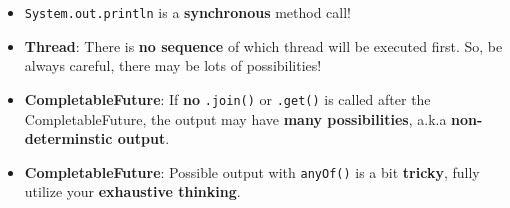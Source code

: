 \documentclass[10pt, landscape]{article}
\begin{document}
\begin{multicols}{4}
\begin{enumerate}
    \begin{itemize}
        \item \texttt{System.out.println} is a \textbf{synchronous} method call!
        \item \textbf{Thread}: There is \textbf{no sequence} of which thread will be executed first. So, be always careful, there may be lots of possibilities!
        \item \textbf{CompletableFuture}: If \textbf{no} \texttt{.join()} or \texttt{.get()} is called after the CompletableFuture, the output may have \textbf{many possibilities}, a.k.a \textbf{non-determinstic output}.
        \item \textbf{CompletableFuture}: Possible output with \texttt{anyOf()} is a bit \textbf{tricky}, fully utilize your \textbf{exhaustive thinking}.
    \end{itemize}
\end{enumerate}


\end{multicols}
\end{document}
